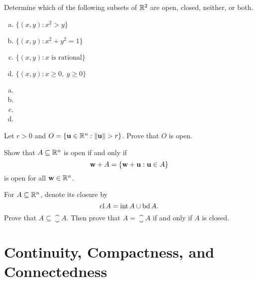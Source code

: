 \documentclass[letterpaper, twoside, 12pt]{book}
\begin{document}
\begin{exercise}[2]
  Determine which of the following subsets of \(\mathbb R^2\) are open, closed,
  neither, or both.
  \begin{enumerate}[(a)]
    \item \(\{(x,y):x^2>y\}\)
    \item \(\{(x,y):x^2+y^2=1\}\)
    \item \(\{(x,y):x \text{~is rational}\}\)
    \item \(\{(x,y):x\geq 0,~y\geq0\}\)
  \end{enumerate}
\end{exercise}
\begin{solution}
  \begin{enumerate}[(a)]
    \item
    \item
    \item
    \item
  \end{enumerate}
\end{solution}

\begin{exercise}[3]
  Let \(r>0\) and \(O=\{\vect u\in\mb R^n:\|\vect u\|>r\}\). Prove that \(O\)
  is open.
\end{exercise}
\begin{solution}

\end{solution}

\begin{exercise}[7a]
  Show that \(A\subseteq\mathbb R^n\) is open if and only if
  \[
    \mathbf w + A = \{\mathbf w+\mathbf u:\mathbf u\in A\}
  \]
  is open for all \(\mathbf w\in\mathbb R^n\).
\end{exercise}
\begin{solution}

\end{solution}

\begin{exercise}[12]
  For \(A\subseteq\mathbb R^n\), denote its closure by
  \[
    \operatorname{cl} A = \operatorname{int} A \cup \operatorname{bd} A
  .\]
  Prove that \(A\subseteq \closure A\). Then prove that
  \(A=\closure A\) if and only if \(A\) is closed.
\end{exercise}
\begin{solution}

\end{solution}





\chapter{Continuity, Compactness, and Connectedness}
\end{document}
